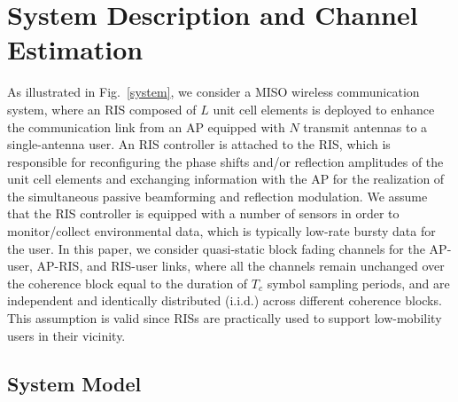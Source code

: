 \documentclass[draftclsnofoot,onecolumn,12pt]{IEEEtran}
\begin{document}
\section{System Description and Channel Estimation}\label{sm and ce}

As illustrated in Fig.~\ref{system}, we consider a MISO wireless communication system, where an RIS composed of $L$ unit cell elements is deployed to enhance the communication link from an AP equipped with $N$ transmit antennas to a single-antenna user. 
An RIS controller is attached
to the RIS, which is responsible for reconfiguring the phase shifts and/or reflection amplitudes of the unit cell elements \cite{Yang2017design} and exchanging information with the AP for the realization of the simultaneous passive beamforming and reflection modulation. 
We assume that the RIS controller is equipped with a number of sensors in order to monitor/collect environmental data, which is typically low-rate bursty data for the user. 
In this paper, we consider quasi-static block fading channels for the AP-user, AP-RIS, and RIS-user links, where all the channels remain unchanged over the coherence block equal to the duration of $T_c$ symbol sampling periods, and are independent and identically distributed (i.i.d.) across different coherence blocks. This assumption is valid since RISs are practically used to support low-mobility users in their vicinity. 

\subsection{System Model}\label{sm}
\end{document}
